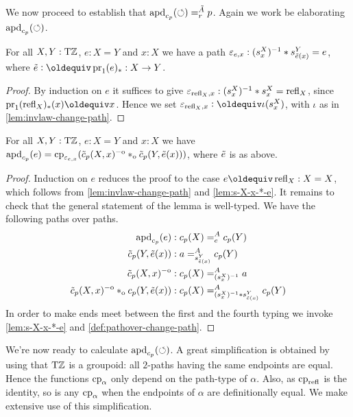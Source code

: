 \documentclass[a4paper,12pt]{amsart}
\begin{document}
We now proceed to establish that $\mathop{{\mathrm{apd}}_{c_p}}({\circlearrowleft}) =^{\tilde A}_r p$.
Again we work be elaborating $\mathop{{\mathrm{apd}}_{c_p}}({\circlearrowleft})$.

\begin{lemma}\label{lem:s-X-x-*-e}
  For all $X,Y:{\mathrm{T}\mathbb{Z}}$, $e: X=Y$ and $x:X$ we have a path
  $\varepsilon_{e,x} : (s^X_x)^{-1} * s^Y_{\tilde {e}(x)} = e$,
  where $\ptoe{e}\defeq \pr_1(e)_* : X\to Y$.
\end{lemma}
\begin{proof}
By induction on $e$ it suffices to give
$\varepsilon_{\mathop{{\mathrm{refl}}_{X}},x} : (s^X_x)^{-1} * s^X_x = \mathop{{\mathrm{refl}}_{X}}$,
since $\pr_1(\refl{X})_*(x) \jdeq x$.
Hence we set $\varepsilon_{\refl{X},x} \defeq \iota(s^X_x)$,
with $\iota$ as in \cref{lem:invlaw-change-path}.
\end{proof}

\begin{lemma}\label{lem:apd-c-tilde-c}
For all $X,Y:{\mathrm{T}\mathbb{Z}}$, $e: X=Y$ and $x:X$ we have
$\mathop{{\mathrm{apd}}_{c_p}}(e) = \mathrm{cp}_{\varepsilon_{e,x}}
(\tilde c_p(X,x)^{-\mathrm{o}}\mathbin{*_{\mathrm{o}}} \tilde c_p(Y,\tilde {e}(x)))$,
where $\tilde {e}$ is as above.
\end{lemma}
\begin{proof}
Induction on $e$ reduces the proof to the case $e\jdeq\refl{X}: X=X$,
which follows from \cref{lem:invlaw-change-path} and \cref{lem:s-X-x-*-e}.
It remains to check that the general statement of the lemma is well-typed.
We have the following paths over paths.
\begin{align*}
\mathop{{\mathrm{apd}}_{c_p}}(e) &: c_p(X) =^A_e c_p(Y)\\
\tilde c_p(Y,\tilde {e}(x)) &:  a =^A_{s^Y_{\tilde {e}(x)}} c_p(Y)\\
\tilde c_p(X,x)^{-\mathrm{o}} &: c_p(X) =^A_{(s^X_x)^{-1}} a\\
\tilde c_p(X,x)^{-\mathrm{o}} \mathbin{*_{\mathrm{o}}} c_p(Y,\tilde {e}(x)) &:
     c_p(X) =^A_{(s^X_x)^{-1}* s^Y_{\tilde {e}(x)}} c_p(Y)
\end{align*}
In order to make ends meet between the first and the fourth typing
we invoke \cref{lem:s-X-x-*-e} and \cref{def:pathover-change-path}.
\end{proof}

We're now ready to calculate $\mathop{{\mathrm{apd}}_{c_p}}({\circlearrowleft})$.
A great simplification is obtained by using that ${\mathrm{T}\mathbb{Z}}$ is a groupoid:
all $2$-paths having the same endpoints are equal.
Hence the functions $\mathrm{cp}_{\alpha}$ only depend on the path-type
of $\alpha$.
Also, as $\mathrm{cp}_{\mathop{{\mathrm{refl}}_{}}}$ is the identity, so is any $\mathrm{cp}_{\alpha}$
when the endpoints of $\alpha$ are definitionally equal.
We make extensive use of this simplification.
\end{document}
